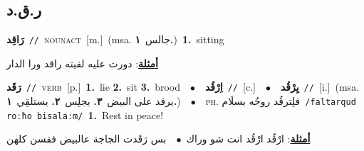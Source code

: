 \documentclass[10pt,a4paper,twoside]{article} %
\begin{document}
\begin{multicols}{2}
\vspace{-3mm}
\subsection*{\color{blue}\foreignlanguage{arabic}{ر.ق.د}\color{blue}{}} 

{\setlength\topsep{0pt}\textbf{\foreignlanguage{arabic}{رَاقِد}}\ {\color{gray}\texttt{//}\color{black}}\ \textsc{noun\textunderscore act}\ [m.]\ \color{gray}(msa. \foreignlanguage{arabic}{جالس}~\foreignlanguage{arabic}{\textbf{١.}})\color{black}\ \textbf{1.}~sitting\  \begin{flushright}\color{gray}\foreignlanguage{arabic}{\textbf{\underline{\foreignlanguage{arabic}{أمثلة}}}: دورت عليه لقيته راقد ورا الدار}\end{flushright}\color{black}} \vspace{2mm}

{\setlength\topsep{0pt}\textbf{\foreignlanguage{arabic}{رَقَد}}\ {\color{gray}\texttt{//}\color{black}}\ \textsc{verb}\ [p.]\ \textbf{1.}~lie  \textbf{2.}~sit  \textbf{3.}~brood\ \ $\bullet$\ \ \setlength\topsep{0pt}\textbf{\foreignlanguage{arabic}{اِرْقُد}}\ {\color{gray}\texttt{//}\color{black}}\ [c.]\ \ $\bullet$\ \ \setlength\topsep{0pt}\textbf{\foreignlanguage{arabic}{يِرْقُد}}\ {\color{gray}\texttt{//}\color{black}}\ [i.]\ \color{gray}(msa. \foreignlanguage{arabic}{يرقد على البيض}~\foreignlanguage{arabic}{\textbf{٣.}}  \foreignlanguage{arabic}{يجلِس}~\foreignlanguage{arabic}{\textbf{٢.}}  \foreignlanguage{arabic}{يستلقِي}~\foreignlanguage{arabic}{\textbf{١.}})\color{black}\ \ $\bullet$\ \ \textsc{ph.} \color{gray} \foreignlanguage{arabic}{فلِترقُد روحُه بسلَام}\color{black}\ {\color{gray}\texttt{/{\sffamily faltarqud roːħo bisalaːm}/}\color{black}}\ \textbf{1.}~Rest in peace!\  \begin{flushright}\color{gray}\foreignlanguage{arabic}{\textbf{\underline{\foreignlanguage{arabic}{أمثلة}}}: ارْقُد ارْقُد انت شو وراك\ $\bullet$\ \  بس رَقَدت الجاجة عالبيض فقسن كلهن}\end{flushright}\color{black}} \vspace{2mm}


\end{multicols}
\end{document}
